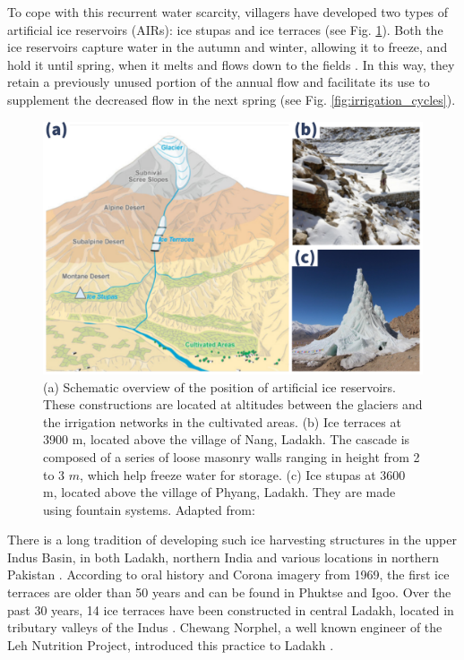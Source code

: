 To cope with this recurrent water scarcity, villagers have developed two types of artificial ice reservoirs
(AIRs): ice stupas and ice terraces (see Fig. \ref{fig:AIRforms}). Both the ice reservoirs capture water in the
autumn and winter, allowing it to freeze, and hold it until spring, when it melts and flows down to the fields
\citep{ipccChapterHighMountain2019, vinceGlacierMan2009, clouseLadakhArtificialGlaciers2017,
nusserSociohydrologyArtificialGlaciers2019}. In this way, they retain a previously unused portion of the annual
flow and facilitate its use to supplement the decreased flow in the next spring (see Fig.
\ref{fig:irrigation_cycles}).

\begin{figure}[t]
\centering
\includegraphics[width=12cm]{figs/AIR_forms.jpg}

\caption{(a) Schematic overview of the position of artificial ice reservoirs. These constructions are located at
  altitudes between the glaciers and the irrigation networks in the cultivated areas. (b) Ice terraces at 3900
  m, located above the village of Nang, Ladakh. The cascade is composed of a series of loose masonry walls
  ranging in height from 2 to 3 $m$, which help freeze water for storage. (c) Ice stupas at 3600 m, located
above the village of Phyang, Ladakh. They are made using fountain systems. Adapted from:
\cite{nusserLocalKnowledgeGlobal2016}}

\label{fig:AIRforms}
\end{figure}

There is a long tradition of developing such ice harvesting structures in the upper Indus Basin, in both Ladakh,
northern India \citep{labbalTraditionalOasesLadakh2000, nusserIrrigationDevelopmentUpper2012} and various
locations in northern Pakistan \citep{kreutzmannScarcityOpulenceWater2011}. According to oral history and Corona
imagery from 1969, the first ice terraces are older than 50 years and can be found in Phuktse and Igoo. Over the
past 30 years, 14 ice terraces have been constructed in central Ladakh, located in
tributary valleys of the Indus \citep{norphelArtificialGlacierHigh2009,
nusserSociohydrologyArtificialGlaciers2019}. Chewang Norphel, a well known engineer of the Leh Nutrition
Project, introduced this practice to Ladakh \citep{vinceGlacierMan2009}.

